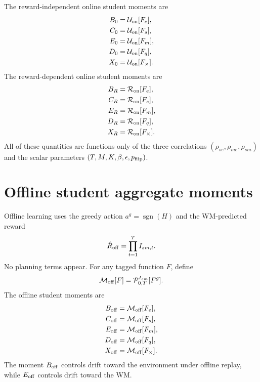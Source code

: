 \documentclass{article}
\newcommand*\sgn[1]{\operatorname{sgn}\!\left({#1}\right)}
\begin{document}
The reward-independent online student moments are
\begin{align}
B_0 &= \mathcal U_{\rm on}[F_e], \\
C_0 &= \mathcal U_{\rm on}[F_s], \\
E_0 &= \mathcal U_{\rm on}[F_m], \\
D_0 &= \mathcal U_{\rm on}[F_q], \\
X_0 &= \mathcal U_{\rm on}[F_\times].
\end{align}
The reward-dependent online student moments are
\begin{align}
B_R &= \mathcal R_{\rm on}[F_e], \\
C_R &= \mathcal R_{\rm on}[F_s], \\
E_R &= \mathcal R_{\rm on}[F_m], \\
D_R &= \mathcal R_{\rm on}[F_q], \\
X_R &= \mathcal R_{\rm on}[F_\times].
\end{align}
All of these quantities are functions only of the three correlations $(\rho_{se},\rho_{me},\rho_{sm})$ and the scalar parameters $(T,M,K,\beta,\epsilon,p_{\rm flip})$.

\section{Offline student aggregate moments}

Offline learning uses the greedy action $a^g=\sgn{H}$ and the WM-predicted reward
\begin{align}
\hat R_{\rm off}=\prod_{t=1}^T I_{sm,t}.
\end{align}
No planning terms appear. For any tagged function $F$, define
\begin{align}
\mathcal M_{\rm off}[F] =\mathcal P_{0,T}^{I_{sm}}[F^g].
\end{align}
The offline student moments are
\begin{align}
B_{\rm off} &= \mathcal M_{\rm off}[F_e], \\
C_{\rm off} &= \mathcal M_{\rm off}[F_s], \\
E_{\rm off} &= \mathcal M_{\rm off}[F_m], \\
D_{\rm off} &= \mathcal M_{\rm off}[F_q], \\
X_{\rm off} &= \mathcal M_{\rm off}[F_\times].
\end{align}
The moment $B_{\rm off}$ controls drift toward the environment under offline replay, while $E_{\rm off}$ controls drift toward the WM.
\end{document}
